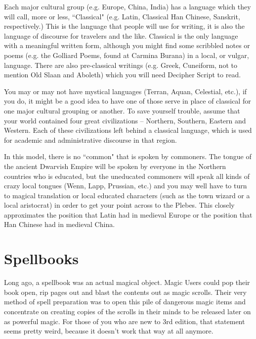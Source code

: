 Each major cultural group (e.g. Europe, China, India) has a language which they will call, more or less, ``Classical" (e.g. Latin, Classical Han Chinese, Sanskrit, respectively.) This is the language that people will use for writing, it is also the language of discourse for travelers and the like. Classical is the only language with a meaningful written form, although you might find some scribbled notes or poems (e.g. the Golliard Poems, found at Carmina Burana) in a local, or vulgar, language. There are also pre-classical writings (e.g. Greek, Cuneiform, not to mention Old Slaan and Aboleth) which you will need Decipher Script to read.

You may or may not have mystical languages (Terran, Aquan, Celestial, etc.), if you do, it might be a good idea to have one of those serve in place of classical for one major cultural grouping or another. To save yourself trouble, assume that your world contained four great civilizations -- Northern, Southern, Eastern and Western. Each of these civilizations left behind a classical language, which is used for academic and administrative discourse in that region.

In this model, there is no ``common" that is spoken by commoners. The tongue of the ancient Dwarvish Empire will be spoken by everyone in the Northern countries who is educated, but the uneducated commoners will speak all kinds of crazy local tongues (Wenn, Lapp, Prussian, etc.) and you may well have to turn to magical translation or local educated characters (such as the town wizard or a local aristocrat) in order to get your point across to the Plebes. This closely approximates the position that Latin had in medieval Europe or the position that Han Chinese had in medieval China.

\section{Spellbooks}
\vspace*{-8pt}

Long ago, a spellbook was an actual magical object. Magic Users could pop their book open, rip pages out and blast the contents out as magic scrolls. Their very method of spell preparation was to open this pile of dangerous magic items and concentrate on creating copies of the scrolls in their minds to be released later on as powerful magic. For those of you who are new to 3rd edition, that statement seems pretty weird, because it doesn't work that way at all anymore.

